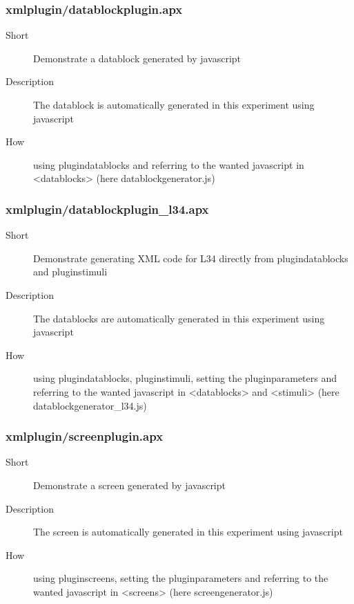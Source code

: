 \subsubsection{xmlplugin/datablockplugin.apx}
\begin{description}
\item[Short] 
 Demonstrate a datablock generated by javascript
\item[Description] 
 The datablock is automatically generated in this experiment using javascript
\item[How] 
 using plugindatablocks and referring to the wanted javascript  in \textless{}datablocks\textgreater{} (here datablockgenerator.js)
\end{description}

\subsubsection{xmlplugin/datablockplugin\_l34.apx}
\begin{description}
\item[Short] 
 Demonstrate generating XML code for L34 directly from plugindatablocks and pluginstimuli
\item[Description] 
 The datablocks are automatically generated in this experiment using javascript
\item[How] 
 using plugindatablocks, pluginstimuli, setting the pluginparameters and referring to the wanted javascript in \textless{}datablocks\textgreater{} and \textless{}stimuli\textgreater{} (here datablockgenerator\_l34.js)
\end{description}

\subsubsection{xmlplugin/screenplugin.apx}
\begin{description}
\item[Short] 
 Demonstrate a screen generated by javascript
\item[Description] 
 The screen is automatically generated in this experiment using javascript
\item[How] 
 using pluginscreens, setting the pluginparameters and referring to the wanted javascript in \textless{}screens\textgreater{} (here screengenerator.js)
\end{description}

